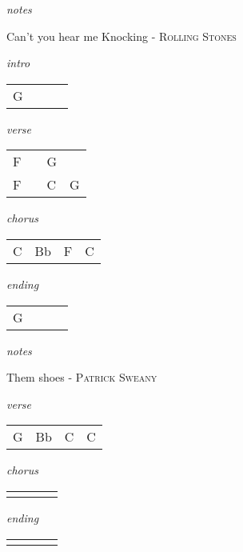 \documentclass[12pt]{article}
\begin{document}
\textit{notes}

\newpage

{\Huge Can't you hear me Knocking} {\huge - \textsc{Rolling Stones}}

\huge
\textit{intro}

\begin{tabular}{|P{1.25in}|P{1.25in}|P{1.25in}|P{1.25in}|}
  G &   &   &   \\
\end{tabular}

\textit{verse}

\begin{tabular}{|P{1.25in}|P{1.25in}|P{1.25in}|P{1.25in}|}
  F &   & G  &   \\
  F &   & C  & G
\end{tabular}

\textit{chorus}

\begin{tabular}{|P{1.25in}|P{1.25in}|P{1.25in}|P{1.25in}|}
  C & Bb  & F  &  C  \\
\end{tabular}

\textit{ending}

\begin{tabular}{|P{1.25in}|P{1.25in}|P{1.25in}|P{1.25in}|}
  G &   &   &   \\
\end{tabular}

\textit{notes}

\newpage

{\Huge Them shoes} {\huge - \textsc{Patrick Sweany}}

\huge
\textit{verse}

\begin{tabular}{|P{1.25in}|P{1.25in}|P{1.25in}|P{1.25in}|}
  G  &  Bb &  C &  C \\
\end{tabular}

\textit{chorus}

\begin{tabular}{|P{1.25in}|P{1.25in}|P{1.25in}|P{1.25in}|}
    &   &   &   \\
\end{tabular}

\textit{ending}

\begin{tabular}{|P{1.25in}|P{1.25in}|P{1.25in}|P{1.25in}|}
    &   &   &   \\
\end{tabular}
\end{document}
